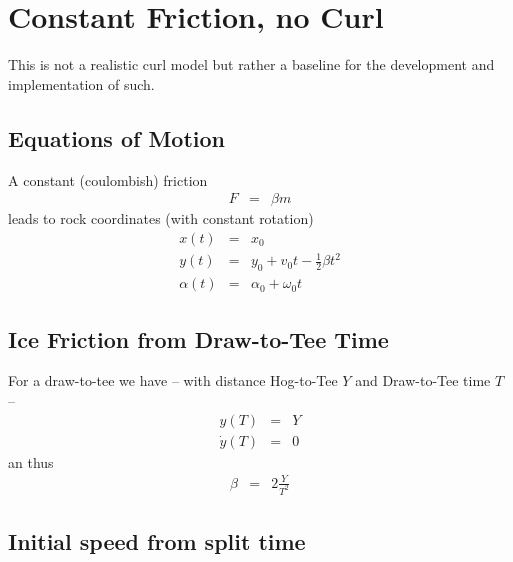 \section{Constant Friction, no Curl}
This is not a realistic curl model but rather a baseline for the development and
implementation of such.

\subsection{Equations of Motion}
A constant (coulombish) friction 
\begin{eqnarray}
F &=& \beta m
\end{eqnarray}
leads to rock coordinates (with constant rotation)
\begin{eqnarray}
x(t) &=& x_0 \\
y(t) &=& y_0 + v_0t - \frac{1}{2}\beta t^2 \\
\alpha(t) &=& \alpha_0 + \omega_0 t
\end{eqnarray}

\subsection{Ice Friction from Draw-to-Tee Time}
For a draw-to-tee we have -- with distance Hog-to-Tee $Y$ and Draw-to-Tee time 
$T$ --
\begin{eqnarray}
y(T) &=& Y \\
\dot y(T) &=& 0
\end{eqnarray}
an thus
\begin{eqnarray}
\beta &=& 2 \frac {Y}{T^2}
\end{eqnarray}

\subsection{Initial speed from split time}
